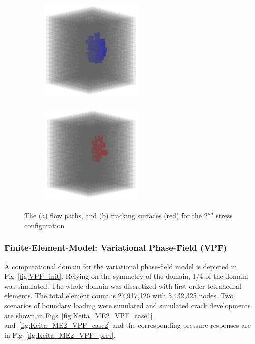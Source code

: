 \begin{figure}[!ht]
\begin{subfigure}[c]{0.48\textwidth}
\centering
\includegraphics[width=5cm,height=5cm]{figures/Amir_ME2_B_Flow_b.png}
\subcaption{}
\label{fig:Amir_ME2_B_Flow_b}
\end{subfigure}
\hfill
\begin{subfigure}[c]{0.48\textwidth}
\centering
\includegraphics[width=5cm,height=5cm]{figures/Amir_ME2_B_Fracture_b.png}
\subcaption{}
\label{fig:Amir_ME2_B_Fracture_b}
\end{subfigure}
\caption{The (a) flow paths, and (b) fracking surfaces (red) for the $2^{nd}$ stress configuration}
\end{figure}




\subsubsection*{Finite-Element-Model: Variational Phase-Field (VPF)}

A computational domain for the variational phase-field model is depicted in Fig~\ref{fig:VPF_init}.
Relying on the symmetry of the domain, 1/4 of the domain was simulated. 
The whole domain was discretized with first-order tetrahedral elements.
The total element count is 27,917,126 with 5,432,325 nodes.
Two scenarios of boundary loading were simulated and simulated crack developments are shown in Figs~\ref{fig:Keita_ME2_VPF_case1} and~\ref{fig:Keita_ME2_VPF_case2} and the corresponding pressure responses are in Fig~\ref{fig:Keita_ME2_VPF_pres}.

